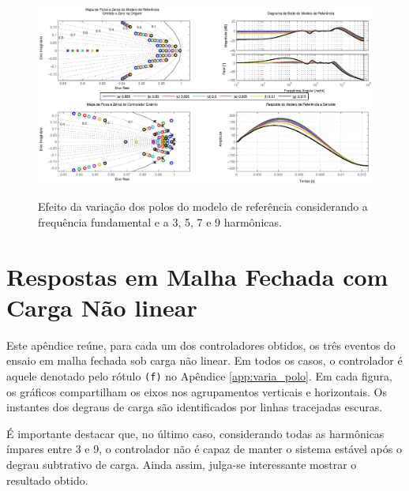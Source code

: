 \documentclass[repeatfields,oneside]{tcc}
\begin{document}
\begin{figure}[!ht]
    \centering
    \caption{Efeito da variação dos polos do modelo de referência considerando a frequência fundamental e a 3{\textordfeminine}, 5{\textordfeminine}, 7{\textordfeminine} e 9{\textordfeminine} harmônicas.}
    \includegraphics[trim={80 20 80 10}, clip, width=\linewidth]{fig/f_9.eps}
    \\
\end{figure}

\chapter{Respostas em Malha Fechada com Carga Não linear}\label{app:respostas}

Este apêndice reúne, para cada um dos controladores obtidos, os três eventos do ensaio em malha fechada sob carga não linear.
Em todos os casos, o controlador é aquele denotado pelo rótulo \texttt{(f)} no Apêndice \ref{app:varia_polo}.
Em cada figura, os gráficos compartilham os eixos nos agrupamentos verticais e horizontais.
Os instantes dos degraus de carga são identificados por linhas tracejadas escuras.

É importante destacar que, no último caso, considerando todas as harmônicas ímpares entre 3 e 9, o controlador não é capaz de manter o sistema estável após o degrau subtrativo de carga.
Ainda assim, julga-se interessante mostrar o resultado obtido.
\end{document}
